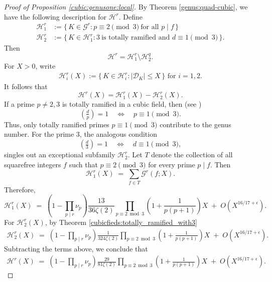 \documentclass[11pt,reqno]{amsart}
\newcommand{\cD}{\mathcal{D}}
\newcommand{\cG}{\mathcal{G}}
\newcommand{\cH}{\mathcal{H}}
\theoremstyle{definition}
\theoremstyle{remark}
\begin{document}
\begin{proof}[Proof of Proposition \ref{cubic:genusone:local}]
By Theorem \ref{genus:quad-cubic}, we have the following description for $\cH^r$.  
Define
\begin{align*}
	\cH_1^r & := \{\, K \in \cG^r : p \equiv 2 \pmod{3} \ \text{for all } p \mid f \,\}\\[4pt]
	\cH_2^r & := \{\, K \in \cH_1^r : 3 \ \text{is totally ramified and } d \equiv 1 \pmod{3} \,\}.
\end{align*}
Then
\begin{equation*}
\cH^r = \cH_1^r \setminus \cH_2^q.
\end{equation*}
For $X > 0$, write
\begin{align*}
    \cH_i^r(X) := \{\, K \in \cH_i^r : |\cD_K| \leq X \,\} \,\,  \text{for } i=1,2.
\end{align*}
It follows that
\[
\cH^r(X) = \cH_1^r(X) - \cH_2^r(X).
\]
If a prime $p \neq 2,3$ is totally ramified in a cubic field, then (see \cite[Example~6.10]{Ishidabook})
\[
\left(\tfrac{d}{p}\right) = 1 \quad \iff \quad p \equiv 1 \pmod{3}.
\]
Thus, only totally ramified primes $p \equiv 1 \pmod{3}$ contribute to the genus number. 
For the prime $3$, the analogous condition
\[
\left(\tfrac{d}{3}\right) = 1 \quad \iff \quad d \equiv 1 \pmod{3},
\]
singles out an exceptional subfamily $\cH_2^r$. Let $T$ denote the collection of all squarefree integers $f$ such that $p \equiv 2 \pmod{3}$ for every prime $p \mid f$.  
Then
\[
\cH_1^r(X) \;=\; \sum_{f \in T} \cG^r(f;X).
\]
Therefore,
\[
\cH_1^r(X) \;=\; \!\left(1 - \prod_{p \mid r} \nu_p \right) \frac{13}{36 \zeta(2)} 
\prod_{p \equiv 2 \bmod{3}} \left( 1 + \frac{1}{p(p+1)} \right) X \;+\; O\!\left(X^{16/17+\epsilon}\right).
\]
For $\cH_2^r(X)$, by Theorem \ref{cubicfieds:totally_ramified_with3} 
\begin{align*}
    \cH_2^r(X) \;=\; \!\left(1 - \prod_{p \mid r} \nu_p \right) \frac{1}{324 \zeta(2)} 
\prod_{p \equiv 2 \bmod{3}} \left( 1 + \frac{1}{p(p+1)} \right) X \;+\; O\!\left(X^{16/17+\epsilon}\right).
\end{align*}
Subtracting the terms above, we conclude that
\begin{align*}
    \cH^r(X) \;=\; \!\left(1 - \prod_{p \mid r} \nu_p \right) \frac{29}{81 \zeta(2)} 
\prod_{p \equiv 2 \bmod{3}} \left( 1 + \frac{1}{p(p+1)} \right) X \;+\; O\!\left(X^{16/17+\epsilon}\right).
\end{align*}
\end{proof}
\end{document}
